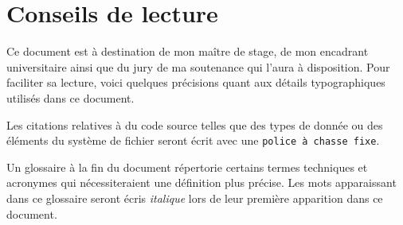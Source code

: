 \section*{Conseils de lecture}
Ce document est à destination de mon maître de stage, de mon encadrant universitaire ainsi que du jury de ma soutenance qui l'aura à disposition. Pour faciliter sa lecture, voici quelques précisions quant aux détails typographiques utilisés dans ce document.

Les citations relatives à du code source telles que des types de donnée ou des éléments du système de fichier seront écrit avec une {\tt police à chasse fixe}.

Un glossaire à la fin du document répertorie certains termes techniques et acronymes qui nécessiteraient une définition plus précise. Les mots apparaissant dans ce glossaire seront écris {\it italique} lors de leur première apparition dans ce document.
